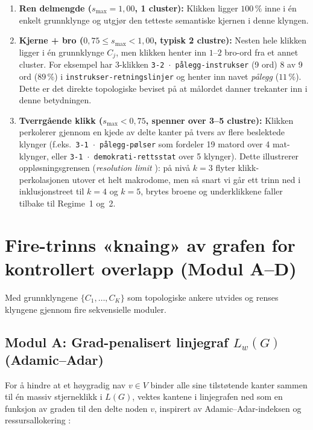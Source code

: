 \documentclass[11pt,a4paper]{article}
\begin{document}
\begin{enumerate}[label=\textbf{Regime \arabic*:}, leftmargin=2.4cm]
  \item \textbf{Ren delmengde ($s_{\max} = 1{,}00$, 1 cluster):} Klikken ligger $100\,\%$ inne i én enkelt grunnklynge og utgjør den tetteste semantiske kjernen i denne klyngen.
  \item \textbf{Kjerne + bro ($0{,}75 \le s_{\max} < 1{,}00$, typisk 2 clustre):} Nesten hele klikken ligger i én grunnklynge $C_j$, men klikken henter inn $1\text{--}2$ bro-ord fra et annet cluster. For eksempel har $3$-klikken \texttt{3-2 $\cdot$ pålegg-instrukser} (9 ord) 8 av 9 ord ($89\,\%$) i \texttt{instrukser-retningslinjer} og henter inn navet \emph{pålegg} ($11\,\%$). Dette er det direkte topologiske beviset på at målordet danner trekanter inn i denne betydningen.
  \item \textbf{Tverrgående klikk ($s_{\max} < 0{,}75$, spenner over 3--5 clustre):} Klikken perkolerer gjennom en kjede av delte kanter på tvers av flere beslektede klynger (f.eks.\ \texttt{3-1 $\cdot$ pålegg-pølser} som fordeler 19 matord over 4 mat-klynger, eller \texttt{3-1 $\cdot$ demokrati-rettsstat} over 5 klynger). Dette illustrerer oppløsningsgrensen (\emph{resolution limit} \cite{fortunato2007resolution, lancichinetti2009community}): på nivå $k=3$ flyter klikk-perkolasjonen utover et helt makrodome, men så snart vi går ett trinn ned i inklusjonstreet til $k=4$ og $k=5$, brytes broene og underklikkene faller tilbake til Regime~1 og~2.
\end{enumerate}

\section{Fire-trinns «knaing» av grafen for kontrollert overlapp (Modul A--D)}

Med grunnklyngene $\{C_1, \dots, C_K\}$ som topologiske ankere utvides og renses klyngene gjennom fire sekvensielle moduler.

\subsection{Modul A: Grad-penalisert linjegraf $L_w(G)$ (Adamic--Adar)}
For å hindre at et høygradig nav $v \in V$ binder alle sine tilstøtende kanter sammen til én massiv stjerneklikk i $L(G)$, vektes kantene i linjegrafen ned som en funksjon av graden til den delte noden $v$, inspirert av Adamic--Adar-indeksen \cite{adamic2003friends} og ressursallokering \cite{zhou2009predicting, evans2009line}:
\end{document}
